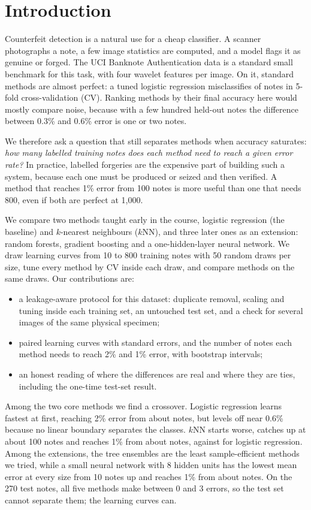 \section{Introduction}
\label{sec:intro}
Counterfeit detection is a natural use for a cheap classifier. A scanner photographs a note, a few image statistics are computed, and a model flags it as genuine or forged. The UCI Banknote Authentication data \cite{lohweg2012uci} is a standard small benchmark for this task, with four wavelet features per image. On it, standard methods are almost perfect: a tuned logistic regression misclassifies \LRcv{} of notes in 5-fold cross-validation (CV). Ranking methods by their final accuracy here would mostly compare noise, because with a few hundred held-out notes the difference between 0.3\% and 0.6\% error is one or two notes.

We therefore ask a question that still separates methods when accuracy saturates: \emph{how many labelled training notes does each method need to reach a given error rate?} In practice, labelled forgeries are the expensive part of building such a system, because each one must be produced or seized and then verified. A method that reaches 1\% error from 100 notes is more useful than one that needs 800, even if both are perfect at 1,000.

We compare two methods taught early in the course, logistic regression (the baseline) and $k$-nearest neighbours ($k$NN), and three later ones as an extension: random forests, gradient boosting and a one-hidden-layer neural network. We draw learning curves from 10 to 800 training notes with 50 random draws per size, tune every method by CV inside each draw, and compare methods on the same draws. Our contributions are:
\begin{itemize}
  \item a leakage-aware protocol for this dataset: duplicate removal, scaling and tuning inside each training set, an untouched test set, and a check for several images of the same physical specimen;
  \item paired learning curves with standard errors, and the number of notes each method needs to reach 2\% and 1\% error, with bootstrap intervals;
  \item an honest reading of where the differences are real and where they are ties, including the one-time test-set result.
\end{itemize}
Among the two core methods we find a crossover. Logistic regression learns fastest at first, reaching 2\% error from about \reachLRTwo{} notes, but levels off near 0.6\% because no linear boundary separates the classes. $k$NN starts worse, catches up at about 100 notes and reaches 1\% from about \reachKNNOne{} notes, against \reachLROne{} for logistic regression. Among the extensions, the tree ensembles are the least sample-efficient methods we tried, while a small neural network with 8 hidden units has the lowest mean error at every size from 10 notes up and reaches 1\% from about \reachNNOne{} notes. On the 270 test notes, all five methods make between 0 and 3 errors, so the test set cannot separate them; the learning curves can.

